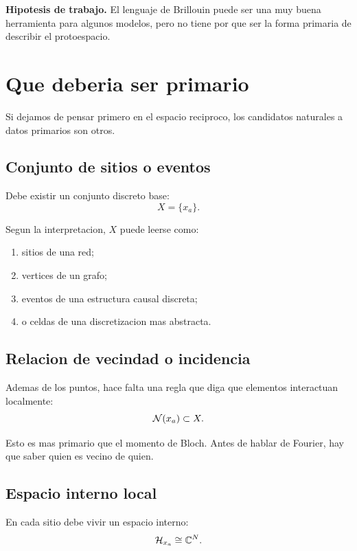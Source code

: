 \begin{displayquote}
\textbf{Hipotesis de trabajo.} El lenguaje de Brillouin puede ser una muy buena herramienta para algunos modelos, pero no tiene por que ser la forma primaria de describir el protoespacio.
\end{displayquote}

\section{Que deberia ser primario}
Si dejamos de pensar primero en el espacio reciproco, los candidatos naturales a datos primarios son otros.

\subsection{Conjunto de sitios o eventos}
Debe existir un conjunto discreto base:
\begin{equation}
X=\{x_a\}.
\end{equation}

Segun la interpretacion, \(X\) puede leerse como:
\begin{enumerate}[label=\arabic*.]
    \item sitios de una red;
    \item vertices de un grafo;
    \item eventos de una estructura causal discreta;
    \item o celdas de una discretizacion mas abstracta.
\end{enumerate}

\subsection{Relacion de vecindad o incidencia}
Ademas de los puntos, hace falta una regla que diga que elementos interactuan localmente:
\begin{equation}
\mathcal{N}(x_a)\subset X.
\end{equation}

Esto es mas primario que el momento de Bloch. Antes de hablar de Fourier, hay que saber quien es vecino de quien.

\subsection{Espacio interno local}
En cada sitio debe vivir un espacio interno:
\begin{equation}
\mathcal{H}_{x_a}\cong \mathbb{C}^N.
\end{equation}

